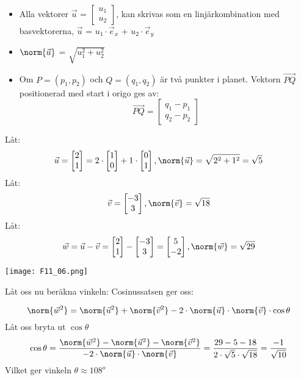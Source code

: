 \begin{itemize}
  \item Alla vektorer $\vec{u}$ = $\begin{bmatrix} u_1 \\ u_2 \end{bmatrix}$, kan skrivas som en linjärkombination med basvektorerna, $\vec{u}$ = $u_1 \cdot \vec{e}_x$ + $u_2 \cdot \vec{e}_y$
  \item $\norm{\vec{u}}$ = $\sqrt{u_1^2 + u_2^2}$
  \item Om $P = (p_1, p_2)$ och $Q = (q_1, q_2)$ är två punkter i planet. Vektorn $\overrightarrow{PQ}$ positionerad med start i origo ges av:
  \[
      \overrightarrow{PQ} = \begin{bmatrix} q_1 - p_1 \\ q_2 - p_2 \end{bmatrix}
  \]
\end{itemize}
\begin{Ex}
    Låt:
    \[
        \vec{u} = \begin{bmatrix} 2 \\ 1 \end{bmatrix} = 2 \cdot \begin{bmatrix} 1 \\ 0 \end{bmatrix} + 1 \cdot \begin{bmatrix} 0 \\ 1 \end{bmatrix}, \norm{\vec{u}} = \sqrt{2^2 + 1^2} = \sqrt{5}
    \]
    Låt:
    \[
      \vec{v} = \begin{bmatrix} -3 \\ 3 \end{bmatrix}, \norm{\vec{v}} = \sqrt{18}
    \]
    Låt:
    \[
        \vec{w} = \vec{u} - \vec{v} = \begin{bmatrix} 2 \\ 1 \end{bmatrix}- \begin{bmatrix} -3 \\ 3 \end{bmatrix} = \begin{bmatrix} 5 \\ -2 \end{bmatrix}, \norm{\vec{w}} = \sqrt{29}
    \]

\begin{center}
  \texttt{[image: F11\_06.png]}
\end{center}
\newpage
Låt oss nu beräkna vinkeln: Cosinussatsen ger oss:

\[
    \norm{\vec{w}^2} = \norm{\vec{u}^2} + \norm{\vec{v}^2} - 2 \cdot \norm{\vec{u}} \cdot \norm{\vec{v}} \cdot \cos{{\theta}}
\]
Låt oss bryta ut $\cos{\theta}$
\[
    \cos{\theta} = \frac{\norm{\vec{w}^2} - \norm{\vec{u}^2} - \norm{\vec{v}^2}}{-2 \cdot \norm{\vec{u}} \cdot \norm{\vec{v}}} = \frac{29 - 5 - 18}{2 \cdot \sqrt{5} \cdot \sqrt{18}} = \frac{-1}{\sqrt{10}}
\]
Vilket ger vinkeln $\theta \approx 108^o$
\end{Ex}



